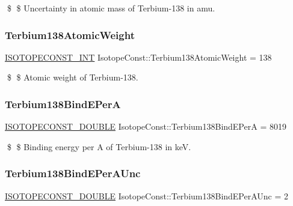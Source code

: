 \$ \$ Uncertainty in atomic mass of Terbium-\/138 in amu. \mbox{\label{group___isotope_const-_terbium-_tb138_ga76f741d8319a9c7415a7545434fb9217}} 
\subsubsection{\texorpdfstring{Terbium138\+Atomic\+Weight}{Terbium138AtomicWeight}}
{\footnotesize\ttfamily \mbox{\hyperlink{group___isotope_const-_macros_ga5f18360b3e99483a35c32d789e62621c}{I\+S\+O\+T\+O\+P\+E\+C\+O\+N\+S\+T\+\_\+\+I\+NT}} Isotope\+Const\+::\+Terbium138\+Atomic\+Weight = 138}

\$ \$ Atomic weight of Terbium-\/138. \mbox{\label{group___isotope_const-_terbium-_tb138_gae6219f3cb4dfa6562f892b8ece836409}} 
\subsubsection{\texorpdfstring{Terbium138\+Bind\+E\+PerA}{Terbium138BindEPerA}}
{\footnotesize\ttfamily \mbox{\hyperlink{group___isotope_const-_macros_ga8f45a7272ce02c0b4c65c44636ed719a}{I\+S\+O\+T\+O\+P\+E\+C\+O\+N\+S\+T\+\_\+\+D\+O\+U\+B\+LE}} Isotope\+Const\+::\+Terbium138\+Bind\+E\+PerA = 8019}

\$ \$ Binding energy per A of Terbium-\/138 in keV. \mbox{\label{group___isotope_const-_terbium-_tb138_ga9fbf11612f47721b8108f5b2c42f8f88}} 
\subsubsection{\texorpdfstring{Terbium138\+Bind\+E\+Per\+A\+Unc}{Terbium138BindEPerAUnc}}
{\footnotesize\ttfamily \mbox{\hyperlink{group___isotope_const-_macros_ga8f45a7272ce02c0b4c65c44636ed719a}{I\+S\+O\+T\+O\+P\+E\+C\+O\+N\+S\+T\+\_\+\+D\+O\+U\+B\+LE}} Isotope\+Const\+::\+Terbium138\+Bind\+E\+Per\+A\+Unc = 2}

